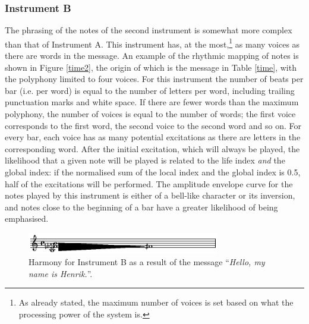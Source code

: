 \subsubsection{Instrument B}
The phrasing of the notes of the second instrument is somewhat more complex than that of Instrument A. This instrument has, at the most,\footnote{As already stated, the maximum number of voices is set based on what the   processing power of the system is.} as many voices as there are words in the message. An example of the rhythmic mapping of notes is shown in Figure \ref{time2}, the origin of which is the message in Table \ref{time}, with the polyphony limited to four voices. For this instrument the number of beats per bar (i.e. per word) is equal to the number of letters per word, including trailing punctuation marks and white space. If there are fewer words than the maximum polyphony, the number of voices is equal to the number of words; the first voice corresponds to the first word, the second voice to the second word and so on. For every bar, each voice has as many potential excitations as there are letters in the corresponding word. After the initial excitation, which will always be played, the likelihood that a given note will be played is related to the life index \emph{and} the global index: if the normalised sum of the local index and the global index is 0.5, half of the excitations will be performed. The amplitude envelope curve for the notes played by this instrument is either of a bell-like character or its inversion, and notes close to the beginning of a bar have a greater likelihood of being emphasised. 

\begin{figure}[!htb]
\begin{center}
\includegraphics[width=0.75\textwidth]{img/ethsnd/chord}
\caption[Harmony for \emph{etherSound}: Instrument B]{Harmony for Instrument B as a result of the message
  ``\emph{Hello, my name is Henrik.}''.} \label{chord}
\end{center}
\end{figure}

